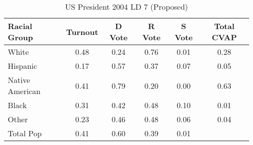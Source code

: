 \begin{table}[htb]
\begin{center}
\caption{US President 2004 LD 7 (Proposed)}
\label{pres04_cvap_ld_7}
\begin{tabular}{lccccc}
  \hline
Racial Group & Turnout & D Vote & R Vote & S Vote & Total CVAP \\ 
  \hline
White & 0.48 & 0.24 & 0.76 & 0.01 & 0.28 \\ 
  Hispanic & 0.17 & 0.57 & 0.37 & 0.07 & 0.05 \\ 
  Native American & 0.41 & 0.79 & 0.20 & 0.00 & 0.63 \\ 
  Black & 0.31 & 0.42 & 0.48 & 0.10 & 0.01 \\ 
  Other & 0.23 & 0.46 & 0.48 & 0.06 & 0.04 \\ 
  Total Pop & 0.41 & 0.60 & 0.39 & 0.01 &  \\ 
   \hline
\end{tabular}
\end{center}
\end{table}

